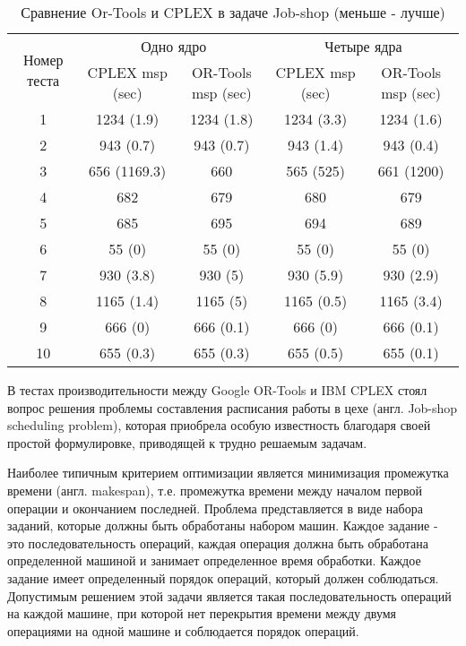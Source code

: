\begin{table}[H]
	\caption{Сравнение Or-Tools и CPLEX в задаче Job-shop (меньше - лучше)}\label{orplextable}
	\begin{adjustbox}{width=1\textwidth}
		\begin{tabular}{|c|c|c|c|c|}
			\hline \multirow{2}{*}{Номер теста} & \multicolumn{2}{|c|}{Одно ядро} & \multicolumn{2}{|c|}{Четыре ядра} \\
			\cline{2-5} & CPLEX msp (sec) & OR-Tools msp (sec) & CPLEX msp (sec) & OR-Tools msp (sec) \\
			\hline 1 & 1234 (1.9) & 1234 (1.8) & 1234 (3.3) & 1234 (1.6) \\
			\hline 2 & 943 (0.7) & 943 (0.7) & 943 (1.4) & 943 (0.4) \\
			\hline 3 & 656 (1169.3) & 660 & 565 (525) & 661 (1200) \\
			\hline 4 & 682 & 679 & 680 & 679 \\
			\hline 5 & 685 & 695 & 694 & 689 \\
			\hline 6 & 55 (0) & 55 (0) & 55 (0) & 55 (0) \\
			\hline 7 & 930 (3.8) & 930 (5) & 930 (5.9) & 930 (2.9) \\
			\hline 8 & 1165  (1.4) & 1165 (5) & 1165 (0.5) & 1165 (3.4) \\
			\hline 9 & 666 (0) & 666 (0.1) & 666 (0) & 666 (0.1) \\
			\hline 10 & 655 (0.3) & 655 (0.3) & 655 (0.5) & 655 (0.1) \\
			\hline 
		\end{tabular}
	\end{adjustbox}
\end{table}

В тестах производительности между Google OR-Tools и IBM CPLEX стоял вопрос решения проблемы составления расписания работы в цехе (англ. Job-shop scheduling problem), которая приобрела особую известность благодаря своей простой формулировке, приводящей к трудно решаемым задачам.

Наиболее типичным критерием оптимизации является минимизация промежутка времени (англ. makespan), т.е. промежутка времени между началом первой операции и окончанием последней. Проблема представляется в виде набора заданий, которые должны быть обработаны набором машин. Каждое задание - это последовательность операций, каждая операция должна быть обработана определенной машиной и занимает определенное время обработки. Каждое задание имеет определенный порядок операций, который должен соблюдаться. Допустимым решением этой задачи является такая последовательность операций на каждой машине, при которой нет перекрытия времени между двумя операциями на одной машине и соблюдается порядок операций.

